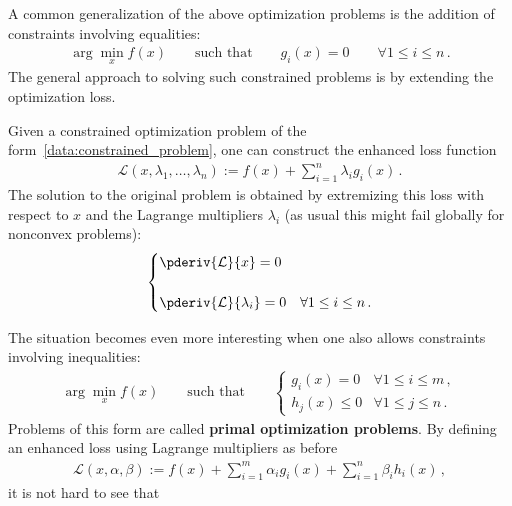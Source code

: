     A common generalization of the above optimization problems is the addition of constraints involving equalities:
    \begin{gather}
        \label{data:constrained_problem}
        \arg\min_x f(x) \qquad\text{such that}\qquad g_i(x)=0\qquad\forall 1\leq i\leq n\,.
    \end{gather}
    The general approach to solving such constrained problems is by extending the optimization loss.
    \begin{method}
        Given a constrained optimization problem of the form~\eqref{data:constrained_problem}, one can construct the enhanced loss function
        \begin{gather}
            \mathcal{L}(x,\lambda_1,\ldots,\lambda_n) := f(x) + \sum_{i=1}^n\lambda_ig_i(x)\,.
        \end{gather}
        The solution to the original problem is obtained by extremizing this loss with respect to $x$ and the Lagrange multipliers $\lambda_i$ (as usual this might fail globally for nonconvex problems):
        \begin{gather}
            \begin{cases}
                \pderiv{\mathcal{L}}{x} = 0\\\\
                \pderiv{\mathcal{L}}{\lambda_i} = 0&\forall1\leq i\leq n\,.
            \end{cases}
        \end{gather}
    \end{method}
    The situation becomes even more interesting when one also allows constraints involving inequalities:
    \begin{gather}
        \label{data:constrained_optimization}
        \arg\min_xf(x)\qquad\text{such that}\qquad
        \begin{cases}
            g_i(x)=0&\forall 1\leq i\leq m\,,\\
            h_j(x)\leq0&\forall 1\leq j\leq n\,.
        \end{cases}
    \end{gather}
    Problems of this form are called \textbf{primal optimization problems}. By defining an enhanced loss using Lagrange multipliers as before
    \begin{gather}
        \mathcal{L}(x,\alpha,\beta) := f(x) + \sum_{i=1}^m\alpha_ig_i(x) + \sum_{i=1}^n\beta_ih_i(x)\,,
    \end{gather}
    it is not hard to see that
